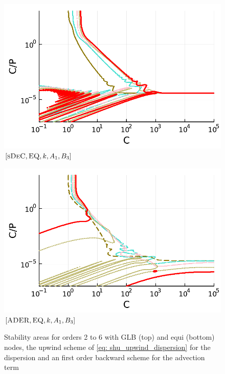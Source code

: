\begin{figure}
\begin{minipage}[t]{0.32\textwidth}
		\includegraphics[width=\textwidth]{pdf/pdepics/disp/IMEXDeC_subtimesteps_equispaced_disp_TMM_2-6_newE.pdf}
		\small$[\textsc{sDeC}, \textsc{EQ},k, A_1,B_3]$\par
	\end{minipage}
	\begin{minipage}[t]{0.32\textwidth}
		\centering
		\includegraphics[width=\textwidth]{pdf/pdepics/disp/IMEXADER_equispaced_disp_TMM_2-6_newE.pdf}
		\small$[\textsc{ADER}, \textsc{EQ},k, A_1,B_3]$\par
	\end{minipage}
	\caption{Stability areas for orders 2 to 6 with GLB (top) and equi (bottom) nodes, the upwind scheme of \eqref{eq: shu_upwind_dispersion} for the dispersion and an first order backward scheme for the advection term}
	\label{fig: disp_allRK}
\end{figure}

